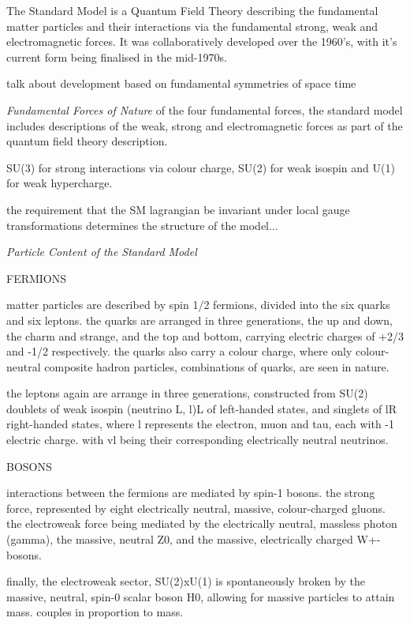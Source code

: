 The Standard Model is a Quantum Field Theory describing the fundamental 
matter particles and their interactions via the fundamental strong, weak and 
electromagnetic forces. It was collaboratively developed over the 1960's, with
it's current form being finalised in the mid-1970s.

talk about development
based on fundamental symmetries of space time



\emph{Fundamental Forces of Nature}
of the four fundamental forces, the standard model includes descriptions of the 
weak, strong and electromagnetic forces as part of the quantum field theory 
description.

SU(3) for strong interactions via colour charge, SU(2) for weak isospin and U(1) 
for weak hypercharge.

the requirement that the SM lagrangian be invariant under local gauge 
transformations determines the structure of the model...

\emph{Particle Content of the Standard Model}

FERMIONS

matter particles are described by spin 1/2 fermions, divided into the six quarks and six 
leptons. the quarks are arranged in three generations, the up and down, the charm
and strange, and the top and bottom, carrying electric charges of +2/3 and -1/2 
respectively. the quarks also carry a colour charge, where only colour-neutral 
composite hadron particles, combinations of quarks, are seen in nature.

the leptons again are arrange in three generations, constructed from SU(2) 
doublets of weak isospin (neutrino L, l)L of left-handed states, and singlets of
lR right-handed states, where l represents the electron, muon and tau, each with
-1 electric charge. with vl being their corresponding electrically neutral neutrinos.

BOSONS

interactions between the fermions are mediated by spin-1 bosons. the strong 
force, represented by eight electrically neutral, massive, colour-charged 
gluons. the electroweak force being mediated by the electrically neutral, 
massless photon (gamma), the massive, neutral Z0, and the massive, electrically 
charged W+- bosons.

finally, the electroweak sector, SU(2)xU(1) is spontaneously broken by the 
massive, neutral, spin-0 scalar boson H0, allowing for massive particles to 
attain mass. couples in proportion to mass.

